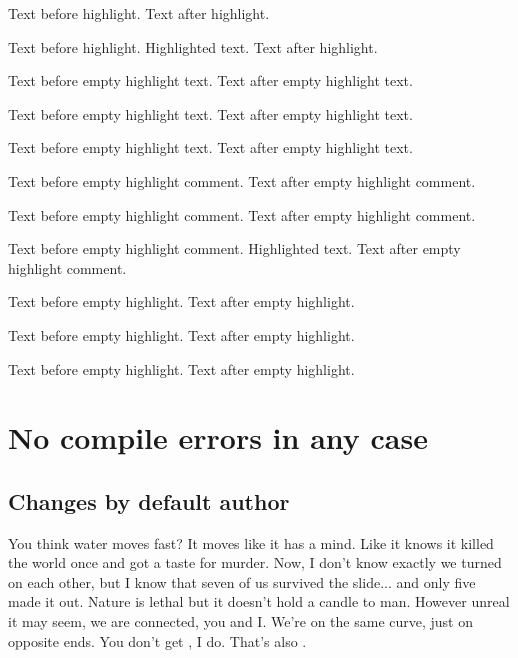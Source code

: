 \documentclass[11pt, a4paper, notitlepage, english]{article}
\begin{document}
Text before highlight.  Text after highlight.

Text before highlight.
Highlighted text.
Text after highlight.

Text before empty highlight text.
\highlight[comment={Highlight comment}]{}
Text after empty highlight text.

Text before empty highlight text. \highlight[comment={Highlight comment}]{} Text after empty highlight text.

Text before empty highlight text.
Text after empty highlight text.

Text before empty highlight comment.
Text after empty highlight comment.

Text before empty highlight comment.  Text after empty highlight comment.

Text before empty highlight comment.
Highlighted text.
Text after empty highlight comment.

Text before empty highlight.
\highlight[comment={}]{}
Text after empty highlight.

Text before empty highlight. \highlight[comment={}]{} Text after empty highlight.

Text before empty highlight.
Text after empty highlight.


\section{No compile errors in any case}

\listofchanges
\listofchanges[style=summary]
\listofchanges[style=compactsummary]

\subsection*{Changes by default author}

You think water moves fast?
It moves like it has a mind.
Like it knows it killed the world once and got a taste for murder.
Now, I don't know exactly  we turned on each other, but I know that seven of us survived the slide... and only five made it out.
Nature is lethal but it doesn't hold a candle to man.
However unreal it may seem, we are connected, you and I.
We're on the same curve, just on opposite ends.
You don't get , I do.
That's also .
\end{document}
